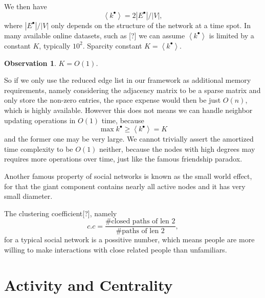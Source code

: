 \documentclass[12pt,abstract=true]{scrartcl}
\numberwithin{equation}{section}
\theoremstyle{definition}   \newtheorem{definition}{Definition}[section]
\theoremstyle{plain}        \newtheorem{theorem}{Theorem}[section]
\theoremstyle{plain}        \newtheorem{observation}{Observation}[section]
\theoremstyle{plain}        \newtheorem{fact}{Fact}[section]
\theoremstyle{plain}        \newtheorem{claim}{Claim}[section]
\theoremstyle{plain}        \newtheorem{lemma}[theorem]{Lemma}
\theoremstyle{plain}        \newtheorem{corollary}[theorem]{Corollary}
\theoremstyle{remark}       \newtheorem{example}{Example}[section]
\theoremstyle{remark}       \newtheorem{remark}{Remark}[section]
\begin{document}
We then have
\begin{equation}
\left<k^\bullet\right>=2\left|E^\bullet\right|/\left|V\right|,
\end{equation}
where $\left|E^\bullet\right|/\left|V\right|$ only depends on the structure of
the network at a time spot. In many available online datasets, such as [?]%
we can assume $\left<k^\bullet\right>$ is limited by a constant $K$, typically
$10^2$.
 Sparcity constant $K=\left<k^\bullet\right>$.

\begin{observation} $K=O(1)$.
\end{observation}
So if we only use the reduced edge list in our framework as additional memory
requirements, namely considering the adjacency matrix to be a sparse matrix and
only store the non-zero entries, the space expense would then be just $O(n)$,
which is highly available. However this does not means we can handle neighbor
updating operations in $O(1)$ time, because
\begin{equation}
\max k^\bullet\geq \left<k^\bullet\right>=K
\end{equation}
and the former one may be very large.  We cannot trivially assert the amortized
time complexity to be $O(1)$ neither, because the nodes with high degrees may
requires more operations over time, just like the famous friendship
paradox\cite{feld1991your}.

Another famous property of social networks is known as the small world
effect\cite{buchanan2003nexus}, for that the giant component contains nearly
all active nodes and it has very small diameter.

The clustering coefficient[?], namely
\begin{equation}
c.c=\frac{\#\text{closed paths of len 2}}{\#\text{paths of len 2}},
\end{equation}
for a typical social network is a possitive
number, which means people are more willing to make interactions with close
related people than unfamiliars. 

\section{Activity and Centrality}
\end{document}
